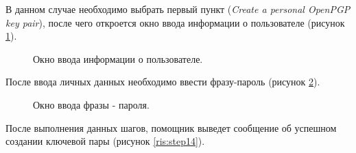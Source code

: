 \documentclass[10pt,a4paper]{report}
\begin{document}
В данном случае необходимо выбрать первый пункт (\textit{Create a personal OpenPGP key pair}), после чего откроется окно ввода информации о пользователе (рисунок \ref{ris:step12}).

\begin{figure}[h]
	\caption{Окно ввода информации о пользователе.}
	\label{ris:step12}
\end{figure}

После ввода личных данных необходимо ввести фразу-пароль (рисунок \ref{ris:step13}).

\begin{figure}[h]
	\caption{Окно ввода фразы - пароля.}
	\label{ris:step13}

\end{figure}

После выполнения данных шагов, помощник выведет сообщение об успешном создании ключевой пары (рисунок \ref{ris:step14}).
\end{document}
